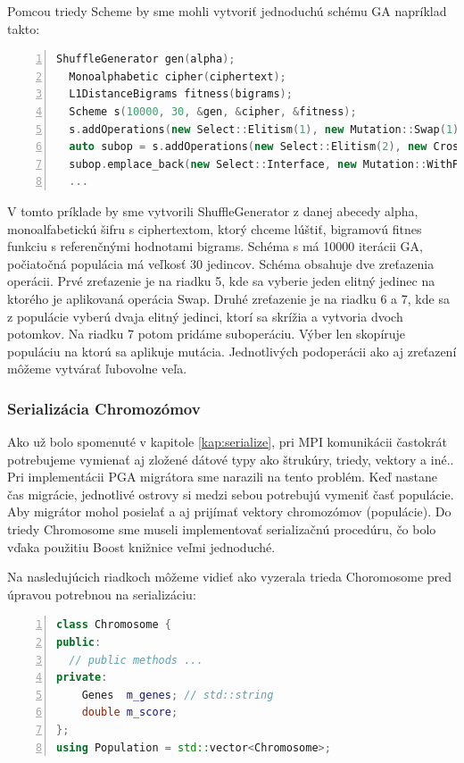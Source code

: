 Pomcou triedy Scheme by sme mohli vytvoriť jednoduchú schému GA napríklad takto:
\begin{lstlisting}[language={c++}, numbers={left}]
  ShuffleGenerator gen(alpha);
  Monoalphabetic cipher(ciphertext);
  L1DistanceBigrams fitness(bigrams);
  Scheme s(10000, 30, &gen, &cipher, &fitness);
  s.addOperations(new Select::Elitism(1), new Mutation::Swap(1));
  auto subop = s.addOperations(new Select::Elitism(2), new Crossover::SinglePoint(2));
  subop.emplace_back(new Select::Interface, new Mutation::WithProbability(0.25));
  ...
\end{lstlisting}
V tomto príklade by sme vytvorili ShuffleGenerator z danej abecedy alpha, monoalfabetickú šifru s ciphertextom, ktorý chceme lúštiť, bigramovú fitnes funkciu s referenčnými hodnotami bigrams. Schéma s má 10000 iterácii GA, počiatočná populácia má veľkosť 30 jedincov. Schéma obsahuje dve zreťazenia operácii. Prvé zreťazenie je na riadku 5, kde sa vyberie jeden elitný jedinec na ktorého je aplikovaná operácia Swap. Druhé zreťazenie je na riadku 6 a 7, kde sa z populácie vyberú dvaja elitný jedinci, ktorí sa skrížia a vytvoria dvoch potomkov. Na riadku 7 potom pridáme suboperáciu. Výber len skopíruje populáciu na ktorú sa aplikuje mutácia.
Jednotlivých podoperácii ako aj zreťazení môžeme vytvárať ľubovolne veľa.

\subsubsection{Serializácia Chromozómov}
Ako už bolo spomenuté v kapitole \ref{kap:serialize}, pri MPI komunikácii častokrát potrebujeme vymienať aj zložené dátové typy ako štrukúry, triedy, vektory a iné..
Pri implementácii PGA migrátora sme narazili na tento problém. Keď nastane čas migrácie, jednotlivé ostrovy si medzi sebou potrebujú vymeniť časť populácie.
Aby migrátor mohol posielať a aj prijímať vektory chromozómov (populácie). Do triedy Chromosome sme museli implementovať serializačnú procedúru, čo bolo vďaka použitiu Boost knižnice veľmi jednoduché.

Na nasledujúcich riadkoch môžeme vidieť ako vyzerala trieda Choromosome pred úpravou potrebnou na serializáciu:
\begin{lstlisting}[language={c++}, numbers={left}]
class Chromosome {
public:
  // public methods ...
private:
    Genes  m_genes; // std::string
    double m_score;
};
using Population = std::vector<Chromosome>;
\end{lstlisting}

